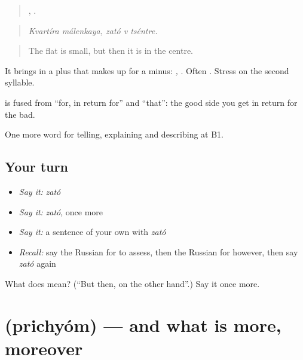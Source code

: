 \begin{quote}
 ,   .
\end{quote}

\begin{quote}
\emph{Kvartíra málenkaya, zató v tséntre.}
\end{quote}

\begin{quote}
The flat is small, but then it is in the centre.
\end{quote}

It brings in a plus that makes up for a minus: \emph{,  }. Often \emph{ }. Stress on the second syllable.

\begin{cousinweb}
\textbf{} is fused from \emph{} \textquotedblleft{}for, in return for\textquotedblright{} and \emph{} \textquotedblleft{}that\textquotedblright{}: the good side you get in return for the bad.
\end{cousinweb}

\begin{grammarlens}[title={What you've built}]
One more word for telling, explaining and describing at B1.
\end{grammarlens}

\subsection*{Your turn}
\begin{itemize}
\raggedright
  \item \emph{Say it:} \emph{zató}
  \item \emph{Say it:} \emph{zató}, once more
  \item \emph{Say it:} a sentence of your own with \emph{zató}
  \item \emph{Recall:} say the Russian for to assess, then the Russian for however, then say \emph{zató} again
\end{itemize}

\begin{tcolorbox}[breakable,colback=teal!4,colframe=teal!35!black,title={Before you move on}]
What does  mean? (\textquotedblleft{}But then, on the other hand\textquotedblright{}.) Say it once more.
\end{tcolorbox}
\section[\texorpdfstring{\ru{причём} (prichyóm)}{причём (prichyóm)}]{ (prichyóm) — and what is more, moreover}


